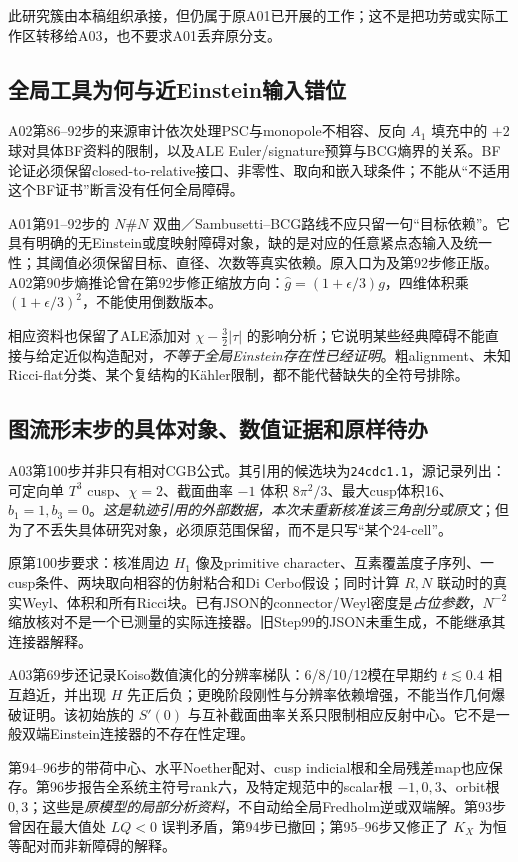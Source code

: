 \documentclass[UTF8,a4paper,11pt,fontset=fandol]{ctexart}
\numberwithin{equation}{section}
\theoremstyle{definition}
\begin{document}
此研究簇由本稿组织承接，但仍属于原A01已开展的工作；这不是把功劳或实际工作区转移给A03，也不要求A01丢弃原分支。

\subsection{全局工具为何与近Einstein输入错位}
A02第86--92步的来源审计依次处理PSC与monopole不相容、反向 $A_1$ 填充中的 $+2$ 球对具体BF资料的限制，以及ALE Euler/signature预算与BCG熵界的关系。BF论证必须保留closed-to-relative接口、非零性、取向和嵌入球条件；不能从“不适用这个BF证书”断言没有任何全局障碍。

A01第91--92步的 $N\#N$ 双曲／Sambusetti--BCG路线不应只留一句“目标依赖”。它具有明确的无Einstein或度映射障碍对象，缺的是对应的任意紧点态输入及统一性；其阈值必须保留目标、直径、次数等真实依赖。原入口为及第92步修正版。A02第90步熵推论曾在第92步修正缩放方向：$\widehat g=(1+\epsilon/3)g$，四维体积乘 $(1+\epsilon/3)^2$，不能使用倒数版本。

相应资料也保留了ALE添加对 $\chi-\frac32|\tau|$ 的影响分析；它说明某些经典障碍不能直接与给定近似构造配对，\emph{不等于全局Einstein存在性已经证明}。粗alignment、未知Ricci-flat分类、某个复结构的K\"ahler限制，都不能代替缺失的全符号排除。

\subsection{图流形末步的具体对象、数值证据和原样待办}
A03第100步并非只有相对CGB公式。其引用的候选块为\texttt{24cdc1.1}，源记录列出：可定向单 $T^3$ cusp、$\chi=2$、截面曲率 $-1$ 体积 $8\pi^2/3$、最大cusp体积16、$b_1=1,b_3=0$。\emph{这是轨迹引用的外部数据，本次未重新核准该三角剖分或原文}；但为了不丢失具体研究对象，必须原范围保留，而不是只写“某个24-cell”。

原第100步要求：核准周边 $H_1$ 像及primitive character、互素覆盖度子序列、一cusp条件、两块取向相容的仿射粘合和Di Cerbo假设；同时计算 $R,N$ 联动时的真实Weyl、体积和所有Ricci块。已有JSON的connector/Weyl密度是\emph{占位参数}，$N^{-2}$缩放核对不是一个已测量的实际连接器。旧Step99的JSON未重生成，不能继承其连接器解释。

A03第69步还记录Koiso数值演化的分辨率梯队：6/8/10/12模在早期约 $t\lesssim0.4$ 相互趋近，并出现 $H$ 先正后负；更晚阶段刚性与分辨率依赖增强，不能当作几何爆破证明。该初始族的 $S'(0)$ 与互补截面曲率关系只限制相应反射中心。它不是一般双端Einstein连接器的不存在性定理。

第94--96步的带荷中心、水平Noether配对、cusp indicial根和全局残差map也应保存。第96步报告全系统主符号rank六，及特定规范中的scalar根 $-1,0,3$、orbit根 $0,3$；这些是\emph{原模型的局部分析资料}，不自动给全局Fredholm逆或双端解。第93步曾因在最大值处 $LQ<0$ 误判矛盾，第94步已撤回；第95--96步又修正了 $K_X$ 为恒等配对而非新障碍的解释。
\end{document}
